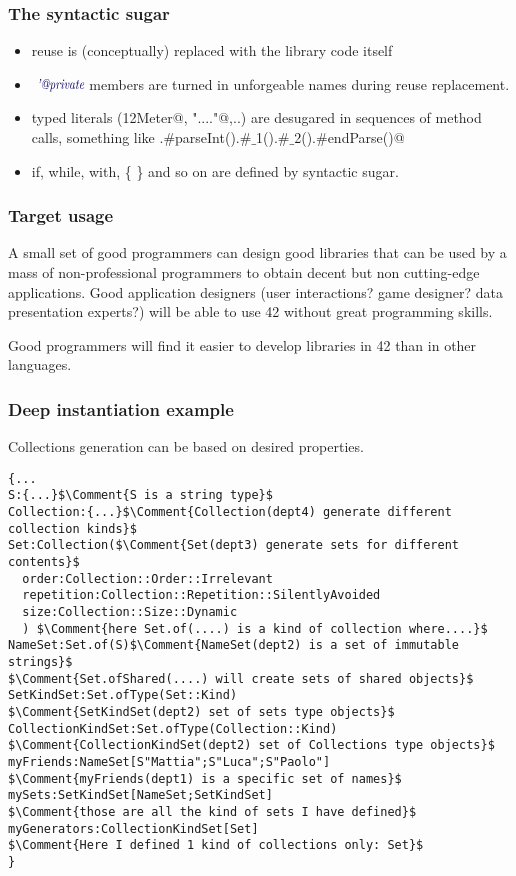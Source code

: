 %
\begin{frame}[fragile]
\addtocounter{framenumber}{-1}
\frametitle{The syntactic sugar}
\begin{itemize}
\item reuse is (conceptually) replaced with the library code itself
\item $\Comment{@private}$ members are turned in unforgeable names during reuse replacement.
\item typed literals (\Q@12Meter@, \Q@DBConnection"...."@,..)
are desugared in sequences of method calls, something like \Q@Meters.#parseInt().#$\_$1().#$\_$2().#endParse()@
\item if, while, with, \{ \} and so on are defined by syntactic sugar.
\end{itemize}


\end{frame}



\begin{frame}[fragile]
\addtocounter{framenumber}{-1}
\frametitle{Target usage}
A small set of good programmers can design good libraries that can be used by a mass of
non-professional programmers to obtain decent but non cutting-edge applications.
Good application designers 
(user interactions? game designer? data presentation experts?)
will be able to use 42 without great programming skills.

Good programmers will find it easier to develop libraries in 42 than in other languages.
\end{frame}


\begin{frame}[fragile]
\addtocounter{framenumber}{-1}
\frametitle{Deep instantiation example}
Collections generation can be based on desired properties.
\begin{NiceCode}{59ex}{0.8}
\begin{lstlisting}
{...
S:{...}$\Comment{S is a string type}$
Collection:{...}$\Comment{Collection(dept4) generate different collection kinds}$
Set:Collection($\Comment{Set(dept3) generate sets for different contents}$
  order:Collection::Order::Irrelevant
  repetition:Collection::Repetition::SilentlyAvoided
  size:Collection::Size::Dynamic
  ) $\Comment{here Set.of(....) is a kind of collection where....}$
NameSet:Set.of(S)$\Comment{NameSet(dept2) is a set of immutable strings}$
$\Comment{Set.ofShared(....) will create sets of shared objects}$
SetKindSet:Set.ofType(Set::Kind)
$\Comment{SetKindSet(dept2) set of sets type objects}$
CollectionKindSet:Set.ofType(Collection::Kind)
$\Comment{CollectionKindSet(dept2) set of Collections type objects}$
myFriends:NameSet[S"Mattia";S"Luca";S"Paolo"]
$\Comment{myFriends(dept1) is a specific set of names}$
mySets:SetKindSet[NameSet;SetKindSet]
$\Comment{those are all the kind of sets I have defined}$
myGenerators:CollectionKindSet[Set]
$\Comment{Here I defined 1 kind of collections only: Set}$
}
\end{lstlisting}
\end{NiceCode}
\end{frame}



